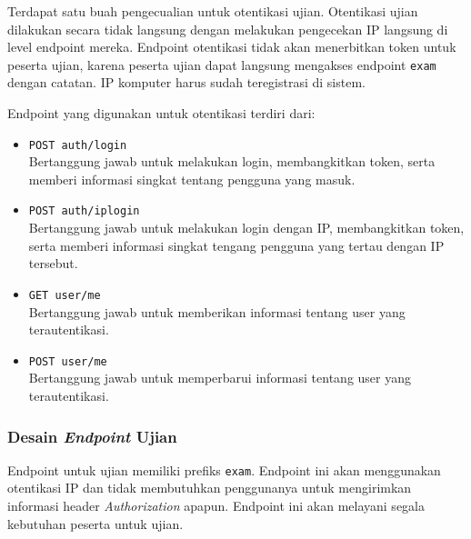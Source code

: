     Terdapat satu buah pengecualian untuk otentikasi ujian. Otentikasi ujian dilakukan secara tidak
    langsung dengan melakukan pengecekan IP langsung di level endpoint mereka. Endpoint otentikasi
    tidak akan menerbitkan token untuk peserta ujian, karena peserta ujian dapat langsung
    mengakses endpoint \texttt{exam} dengan catatan. IP komputer harus sudah teregistrasi di
    sistem.
    
    Endpoint yang digunakan untuk otentikasi terdiri dari:
    \begin{itemize}
        \item \texttt{POST auth/login} \\
            Bertanggung jawab untuk melakukan login, membangkitkan token, serta memberi informasi
            singkat tentang pengguna yang masuk.
        
        \item \texttt{POST auth/iplogin} \\
            Bertanggung jawab untuk melakukan login dengan IP, membangkitkan token, serta memberi
            informasi singkat tengang pengguna yang tertau dengan IP tersebut.
            
        \item \texttt{GET user/me} \\
            Bertanggung jawab untuk memberikan informasi tentang user yang terautentikasi.
            
        \item \texttt{POST user/me} \\
            Bertanggung jawab untuk memperbarui informasi tentang user yang terautentikasi.
    \end{itemize}
    
\subsubsection{Desain \textit{Endpoint} Ujian}
    Endpoint untuk ujian memiliki prefiks \texttt{exam}. Endpoint ini akan menggunakan otentikasi
    IP dan tidak membutuhkan penggunanya untuk mengirimkan informasi header \textit{Authorization}
    apapun. Endpoint ini akan melayani segala kebutuhan peserta untuk ujian.
    
